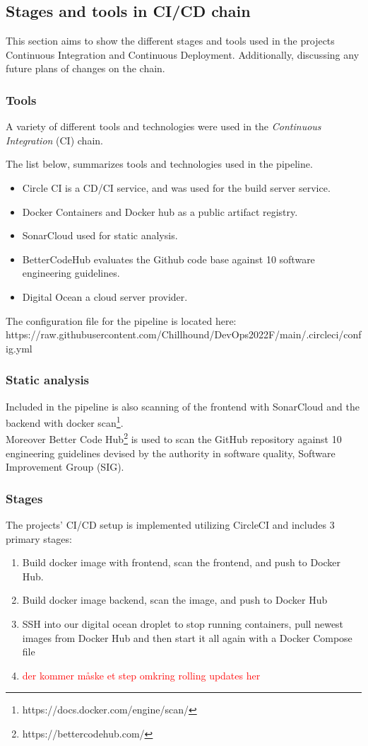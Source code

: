 \subsection{Stages and tools in CI/CD chain}
This section aims to show the different stages and tools used in the projects Continuous Integration and Continuous Deployment. Additionally, discussing any future plans of changes on the chain.

\subsubsection{Tools}
A variety of different tools and technologies were used in the \textit{Continuous Integration} (CI) chain. 

The list below, summarizes tools and technologies used in the pipeline. 
\begin{itemize}
    \item Circle CI is a CD/CI service, and was used for the build server service.
    \item Docker Containers and Docker hub as a public artifact registry.
    \item SonarCloud used for static analysis.
    \item BetterCodeHub evaluates the Github code base against 10 software engineering guidelines.
    \item Digital Ocean a cloud server provider.
\end{itemize}

The configuration file for the pipeline is located here: https://raw.githubusercontent.com/Chillhound/DevOps2022F/main/.circleci/config.yml

\subsubsection*{Static analysis}
Included in the pipeline is also scanning of the frontend with SonarCloud and the backend with docker scan\footnote{https://docs.docker.com/engine/scan/}. \\
Moreover Better Code Hub\footnote{https://bettercodehub.com/} is used to scan the GitHub repository against 10 engineering guidelines devised by the authority in software quality, Software Improvement Group (SIG). 

\subsubsection{Stages}
The projects' CI/CD setup is implemented utilizing CircleCI and includes 3 primary stages: 
\begin{enumerate}
    \item Build docker image with frontend, scan the frontend, and push to Docker Hub.
    \item Build docker image backend, scan the image, and push to Docker Hub
    \item SSH into our digital ocean droplet to stop running containers, pull newest images from Docker Hub and then start it all again with a Docker Compose file
    \item \textcolor{red}{der kommer måske et step omkring rolling updates her}
\end{enumerate}

